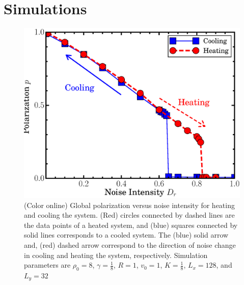 \documentclass[reprint,floatfix,amsmath,amssymb,aps,pre,showkeys,showpacs,superscriptaddress]{revtex4-1}
\begin{document}
\section{Simulations}
\label{section:simulations}

\begin{figure}
	\centering
	\includegraphics[width=\columnwidth]{Fig1_p-noise-sim}
	\caption{(Color online) Global polarization versus noise intensity for heating and cooling the system. (Red) circles connected by dashed lines are the data points of a heated system, and (blue) squares connected by solid lines corresponds to a cooled system. The (blue) solid arrow and, (red) dashed arrow correspond to the direction of noise change in cooling and heating the system, respectively. Simulation parameters are $\rho_0=8$, $\gamma=\tfrac{1}{8}$, $R=1$, $v_0=1$, $K=\tfrac{1}{8}$, $L_x=128$, and $L_y=32$}
	\label{fig:sim-hystersis}
\end{figure}
\end{document}
